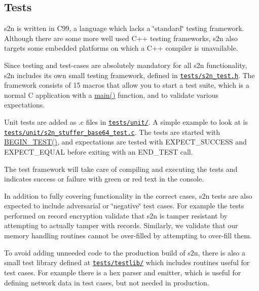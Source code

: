 \subsection*{Tests}

s2n is written in C99, a language which lacks a \char`\"{}standard\char`\"{} testing framework. Although there are some more well used C++ testing frameworks, s2n also targets some embedded platforms on which a C++ compiler is unavailable.

Since testing and test-\/cases are absolutely mandatory for all s2n functionality, s2n includes its own small testing framework, defined in \href{https://github.com/awslabs/s2n/blob/master/tests/s2n_test.h}{\tt tests/s2n\+\_\+test.\+h}. The framework consists of 15 macros that allow you to start a test suite, which is a normal C application with a \hyperlink{s2nc_8c_ad1835a0a190dc5fe4f925bb69443c770}{main()} function, and to validate various expectations.

Unit tests are added as .c files in \href{https://github.com/awslabs/s2n/blob/master/tests/unit/}{\tt tests/unit/}. A simple example to look at is \href{https://github.com/awslabs/s2n/blob/master/tests/unit/s2n_stuffer_base64_test.c}{\tt tests/unit/s2n\+\_\+stuffer\+\_\+base64\+\_\+test.\+c}. The tests are started with \hyperlink{s2n__test_8h_abef58b8851265310b43e5b6d8c1d2ff5}{B\+E\+G\+I\+N\+\_\+\+T\+E\+S\+T()}, and expectations are tested with E\+X\+P\+E\+C\+T\+\_\+\+S\+U\+C\+C\+E\+SS and E\+X\+P\+E\+C\+T\+\_\+\+E\+Q\+U\+AL before exiting with an E\+N\+D\+\_\+\+T\+E\+ST call.

The test framework will take care of compiling and executing the tests and indicates success or failure with green or red text in the console.

In addition to fully covering functionality in the correct cases, s2n tests are also expected to include adversarial or \char`\"{}negative\char`\"{} test cases. For example the tests performed on record encryption validate that s2n is tamper resistant by attempting to actually tamper with records. Similarly, we validate that our memory handling routines cannot be over-\/filled by attempting to over-\/fill them.

To avoid adding unneeded code to the production build of s2n, there is also a small test library defined at \href{https://github.com/awslabs/s2n/blob/master/tests/testlib/}{\tt tests/testlib/} which includes routines useful for test cases. For example there is a hex parser and emitter, which is useful for defining network data in test cases, but not needed in production.

